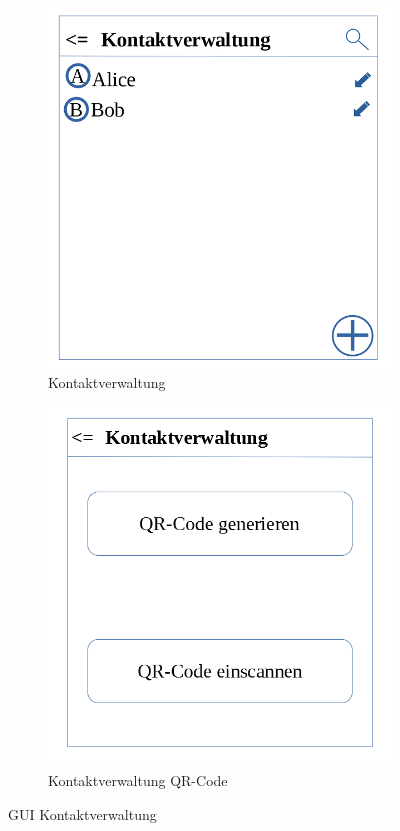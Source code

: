 \begin{figure}[h]
\centering
\begin{subfigure}{.5\textwidth}
  \centering
  \includegraphics[scale=0.3]{gui/Kontaktverwaltung.png}
  \caption{Kontaktverwaltung}
\end{subfigure}%
\begin{subfigure}{.5\textwidth}
  \centering
  \includegraphics[scale=0.3]{gui/Kontaktverwaltung_QR_Code.png}
  \caption{Kontaktverwaltung QR-Code}
\end{subfigure}
\caption{GUI Kontaktverwaltung}
\end{figure}

